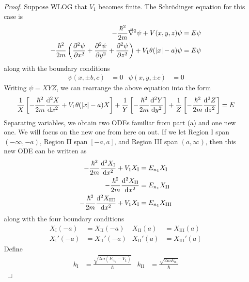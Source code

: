 \documentclass[../psets.tex]{subfiles}
\begin{document}
\begin{enumerate}
\begin{enumerate}
\begin{proof}
            Suppose WLOG that $V_1$ becomes finite. The Schr\"{o}dinger equation for this case is
            \begin{align*}
                -\frac{\hbar^2}{2m}\vec{\nabla}^2\psi+V(x,y,z)\psi &= E\psi\\
                -\frac{\hbar^2}{2m}\left( \pdv[2]{\psi}{x}+\pdv[2]{\psi}{y}+\pdv[2]{\psi}{z} \right)+V_1\theta(|x|-a)\psi &= E\psi
            \end{align*}
            along with the boundary conditions
            \begin{align*}
                \psi(x,\pm b,c) &= 0&
                \psi(x,y,\pm c) &= 0
            \end{align*}
            Writing $\psi=XYZ$, we can rearrange the above equation into the form
            \begin{equation*}
                \frac{1}{X}\left[ -\frac{\hbar^2}{2m}\dv[2]{X}{x}+V_1\theta(|x|-a)X \right]+\frac{1}{Y}\left[ -\frac{\hbar^2}{2m}\dv[2]{Y}{y} \right]+\frac{1}{Z}\left[ -\frac{\hbar^2}{2m}\dv[2]{Z}{z} \right] = E
            \end{equation*}
            Separating variables, we obtain two ODEs familiar from part (a) and one new one. We will focus on the new one from here on out. If we let Region I span $(-\infty,-a)$, Region II span $[-a,a]$, and Region III span $(a,\infty)$, then this new ODE can be written as
            \begin{align*}
                -\frac{\hbar^2}{2m}\dv[2]{X_\text{I}}{x}+V_1X_\text{I} &= E_{n_1}X_\text{I}\\
                -\frac{\hbar^2}{2m}\dv[2]{X_\text{II}}{x} &= E_{n_1}X_\text{II}\\
                -\frac{\hbar^2}{2m}\dv[2]{X_\text{III}}{x}+V_1X_\text{I} &= E_{n_1}X_\text{III}
            \end{align*}
            along with the four boundary conditions
            \begin{align*}
                X_\text{I}(-a) &= X_\text{II}(-a)&
                    X_\text{II}(a) &= X_\text{III}(a)\\
                X_\text{I}'(-a) &= X_\text{II}'(-a)&
                    X_\text{II}'(a) &= X_\text{III}'(a)
            \end{align*}
            Define
            \begin{align*}
                k_\text{I} &= \frac{\sqrt{2m(E_{n_1}-V_1)}}{\hbar}&
                k_\text{II} &= \frac{\sqrt{2mE_{n_1}}}{\hbar}
            \end{align*}

\end{proof}
\end{enumerate}
\end{enumerate}
\end{document}
